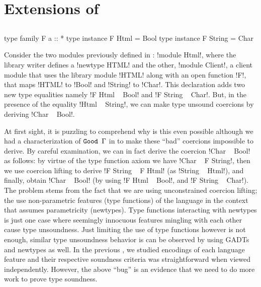 \documentclass[screen,nonacm]{acmart}
\begin{document}
\label{part:III}
\section{Extensions of \SFC}\label{sec:fc-extensions}%
\subsection{\SFR}\label{sec:sfr} %

\begin{CenteredBox}
  \begin{code}
    type family F a :: *
    type instance F Html = Bool
    type instance F String = Char
  \end{code}
\end{CenteredBox}

Consider the two modules previously defined in : !module Html!, where the library writer defines a !newtype HTML! and the other, !module Client!, a client module that uses the library module !HTML! along with an open function !F!, that maps !HTML! to !Bool! and !String! to !Char!. This declaration adds two new type equalities namely !F Html ~ Bool! and !F String ~ Char!. But, in the presence of the equality !Html ~ String!, we can make type unsound coercions by deriving !Char ~ Bool!.

At first sight, it is puzzling to comprehend why is this even possible although we had a characterization of $\texttt{Good~}\Gamma$ in  to make these ``bad'' coercions impossible to derive. By careful examination, we can in fact derive the coercion !Char ~ Bool! as follows: by virtue of the type function axiom we have !Char ~ F String!, then we use coercion lifting to derive !F String ~ F Html! (as !String ~ Html!), and finally, obtain !Char ~ Bool! (by using !F Html ~ Bool!, and !F String ~ Char!). The problem stems from the fact that we are using unconstrained coercion lifting; the use non-parametric features (type functions) of the language in the context that assumes parametricity (newtypes). Type functions interacting with newtypes is just one case where seemingly innocuous features mingling with each other cause type unsoundness. Just limiting the use of type functions however is not enough, similar type unsoundness behavior is can be observed by using GADTs and newtypes as well\cite{weirich_generative_2011}. In the previous , we studied \SFC encodings of each language feature and their respective soundness criteria was straightforward when viewed independently. However, the above ``bug'' is an evidence that we need to do more work to prove type soundness.
\end{document}
